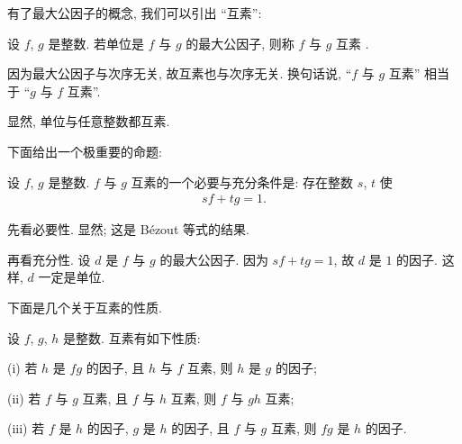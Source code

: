 有了最大公因子的概念, 我们可以引出 ``互素'':
\begin{definition}
    设 $f$, $g$ 是整数. 若单位是 $f$ 与 $g$ 的最大公因子, 则称 $f$ 与 $g$ 互素 .
\end{definition}

\begin{remark}
    因为最大公因子与次序无关, 故互素也与次序无关. 换句话说, ``$f$ 与 $g$ 互素'' 相当于 ``$g$ 与 $f$ 互素''.
\end{remark}

\begin{example}
    显然, 单位与任意整数都互素.
\end{example}

下面给出一个极重要的命题:
\begin{proposition}
    设 $f$, $g$ 是整数. $f$ 与 $g$ 互素的一个必要与充分条件是: 存在整数 $s$, $t$ 使
    \begin{align*}
        sf + tg = 1.
    \end{align*}
\end{proposition}

\begin{pf}
    先看必要性. 显然; 这是 Bézout 等式的结果.

    再看充分性. 设 $d$ 是 $f$ 与 $g$ 的最大公因子. 因为 $sf + tg = 1$, 故 $d$ 是 $1$ 的因子. 这样, $d$ 一定是单位.
\end{pf}

下面是几个关于互素的性质.

\begin{proposition}
    设 $f$, $g$, $h$ 是整数. 互素有如下性质:

    (i) 若 $h$ 是 $fg$ 的因子, 且 $h$ 与 $f$ 互素, 则 $h$ 是 $g$ 的因子;

    (ii) 若 $f$ 与 $g$ 互素, 且 $f$ 与 $h$ 互素, 则 $f$ 与 $gh$ 互素;

    (iii) 若 $f$ 是 $h$ 的因子, $g$ 是 $h$ 的因子, 且 $f$ 与 $g$ 互素, 则 $fg$ 是 $h$ 的因子.
\end{proposition}

